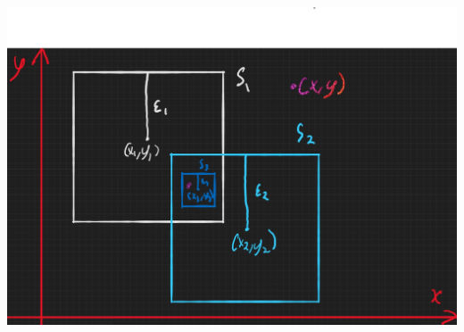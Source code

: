 \begin{solution}
    \begin{center}
    \includegraphics[scale=0.37]{ps5p1.JPG}
    \end{center}

\end{solution}